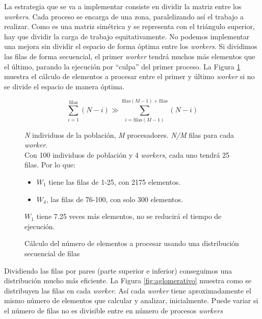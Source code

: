 		La estrategia que se va a implementar consiste en dividir la matriz entre los \textit{workers}. Cada proceso se encarga de una zona, paralelizando así el trabajo a realizar. Como es una matriz simétrica y se representa con el triángulo superior, hay que dividir la carga de trabajo equitativamente. No podemos implementar una mejora sin dividir el espacio de forma óptima entre los \textit{workers}. Si dividimos las filas de forma secuencial, el primer \textit{worker} tendrá muchos más elementos que el último, parando la ejecución por ``culpa'' del primer proceso. La Figura \ref{fig:prueba} muestra el cálculo de elementos a procesar entre el primer y último \textit{worker} si no se divide el espacio de manera óptima. 
		
		
		
		\begin{figure}[!h]		
		\begin{mdframed}[roundcorner=5pt]
			\[
			\sum_{i=1}^{\text{filas}} (N - i) \gg \sum_{i=\text{filas}(M-1)}^{\text{filas}(M-1) + \text{filas}} (N - i)
			\]
			\begin{tcolorbox}[boxrule=0.5pt, fontupper=\small]
				
				\textit{N} individuos de la población, \textit{M} procesadores. \textit{N/M} filas para cada \textit{worker}.\\
				
				Con 100 individuos de población y 4 \textit{workers}, cada uno tendrá 25 filas. Por lo que:
				\begin{itemize}
					\item \(W_{1}\) tiene las filas de 1-25, con 2175 elementos. 
					\item \(W_{4}\), las filas de 76-100, con solo 300 elementos. 					
				\end{itemize}
				
				\(W_{1}\) tiene 7.25 veces más elementos, no se reducirá el tiempo de ejecución.
				
							
			\end{tcolorbox}
			
		\end{mdframed}
		
		\caption{Cálculo del número de elementos a procesar usando una distribución secuencial de filas}
		\label{fig:prueba}
		\end{figure}
		
		
		Dividiendo las filas por pares (parte superior e inferior) conseguimos una distribución mucho más eficiente. La Figura \ref{fig:aglomerativo} muestra como se distribuyen las filas en cada \textit{worker}. Así cada \textit{worker} tiene aproximadamente el mismo número de elementos que calcular y analizar, inicialmente. Puede variar si el número de filas no es divisible entre en número de procesos \textit{workers} 
		
